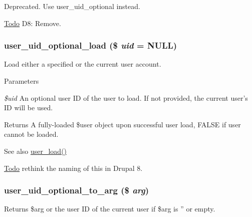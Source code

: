 Deprecated. Use user\_\-uid\_\-optional instead.

\begin{Desc}
\item[\hyperlink{todo__todo000025}{Todo}]D8: Remove. \end{Desc}
\hypertarget{user_8module_adcdb22ab09fce9b389fb10ac76e13b07}{
\subsubsection[{user\_\-uid\_\-optional\_\-load}]{\setlength{\rightskip}{0pt plus 5cm}user\_\-uid\_\-optional\_\-load (\$ {\em uid} = {\ttfamily NULL})}}
\label{user_8module_adcdb22ab09fce9b389fb10ac76e13b07}
Load either a specified or the current user account.


\begin{DoxyParams}{Parameters}
\item[{\em \$uid}]An optional user ID of the user to load. If not provided, the current user's ID will be used. \end{DoxyParams}
\begin{DoxyReturn}{Returns}
A fully-\/loaded \$user object upon successful user load, FALSE if user cannot be loaded.
\end{DoxyReturn}
\begin{DoxySeeAlso}{See also}
\hyperlink{user_8module_a0f7e67c4e909ca691f57889dd5a72a07}{user\_\-load()} 
\end{DoxySeeAlso}
\begin{Desc}
\item[\hyperlink{todo__todo000026}{Todo}]rethink the naming of this in Drupal 8. \end{Desc}
\hypertarget{user_8module_a802368ee732e9da8f756d69b0830225b}{
\subsubsection[{user\_\-uid\_\-optional\_\-to\_\-arg}]{\setlength{\rightskip}{0pt plus 5cm}user\_\-uid\_\-optional\_\-to\_\-arg (\$ {\em arg})}}
\label{user_8module_a802368ee732e9da8f756d69b0830225b}
Returns \$arg or the user ID of the current user if \$arg is '' or empty.


